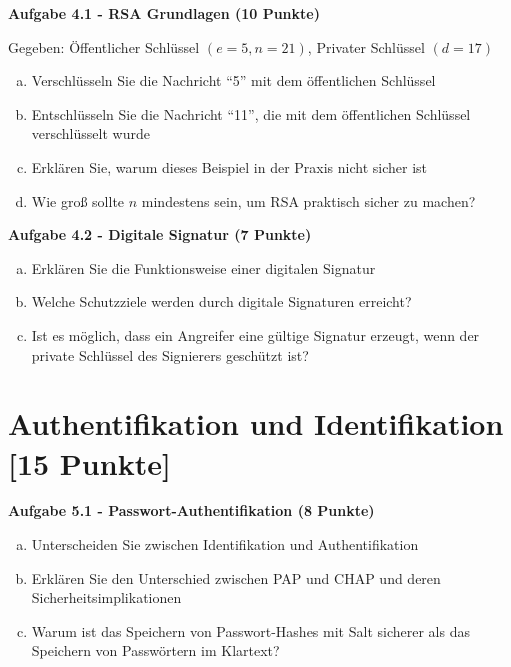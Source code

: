 \documentclass[12pt,a4paper]{article}
\begin{document}
\textbf{Aufgabe 4.1 - RSA Grundlagen (10 Punkte)}

Gegeben: Öffentlicher Schlüssel $(e=5, n=21)$, Privater Schlüssel $(d=17)$

\begin{enumerate}[(a)]
    \item Verschlüsseln Sie die Nachricht ``5'' mit dem öffentlichen Schlüssel
    
    \item Entschlüsseln Sie die Nachricht ``11'', die mit dem öffentlichen Schlüssel verschlüsselt wurde
    
    \item Erklären Sie, warum dieses Beispiel in der Praxis nicht sicher ist
    
    \item Wie groß sollte $n$ mindestens sein, um RSA praktisch sicher zu machen?
\end{enumerate}

\vspace{4cm}

\textbf{Aufgabe 4.2 - Digitale Signatur (7 Punkte)}

\begin{enumerate}[(a)]
    \item Erklären Sie die Funktionsweise einer digitalen Signatur
    
    \item Welche Schutzziele werden durch digitale Signaturen erreicht?
    
    \item Ist es möglich, dass ein Angreifer eine gültige Signatur erzeugt, wenn der private Schlüssel des Signierers geschützt ist?
\end{enumerate}

\vspace{3cm}


\newpage

\section{Authentifikation und Identifikation [15 Punkte]}

\textbf{Aufgabe 5.1 - Passwort-Authentifikation (8 Punkte)}

\begin{enumerate}[(a)]
    \item Unterscheiden Sie zwischen Identifikation und Authentifikation
    
    \item Erklären Sie den Unterschied zwischen PAP und CHAP und deren Sicherheitsimplikationen
    
    \item Warum ist das Speichern von Passwort-Hashes mit Salt sicherer als das Speichern von Passwörtern im Klartext?
\end{enumerate}
\end{document}
